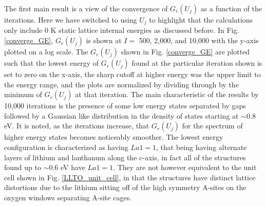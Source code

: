 \documentclass[aps,pre,reprint,superscriptaddress,showkeys]{revtex4-2}
\begin{document}
The first main result is a view of the convergence of $G_r(U_j)$ as a function of the iterations. Here we have switched to using $U_j$ to highlight that the calculations only include 0 K static lattice internal energies as discussed before. In Fig. \ref{converge_GE},  $G_r(U_j)$ is shown at  $I= $ 500, 2,000, and 10,000 with the y-axis plotted on a log scale. The  $G_r(U_j)$ shown in Fig. \ref{converge_GE}  are plotted such that the lowest energy of $G_r(U_j)$ found at the particular iteration shown is set to zero on the x-axis, the sharp cutoff at higher energy was the upper limit to the energy range, and the plots are normalized by dividing through by the minimum of $G_r(U_j)$ at that iteration.  The main characteristic of the results by 10,000 iterations is the presence of some low energy states separated by gaps followed by a Gaussian like distribution in the density of states starting at $\sim$0.8 eV. It is noted, as the iterations increase, that $G_r(U_j)$ for the spectrum of higher energy states becomes noticeably smoother.  The lowest energy configuration is  characterized as having  $La1=1$, that being having alternate layers of lithium and lanthanum along the c-axis, in fact all of the structures found up to $\sim$0.6 eV have $La1=1$. They are not however equivalent to the unit cell shown in Fig. \ref{LLTO_unit_cell}, in that the structures have distinct lattice distortions due to the lithium sitting off of the high symmetry A-sites on the oxygen windows separating A-site cages. 
\end{document}
